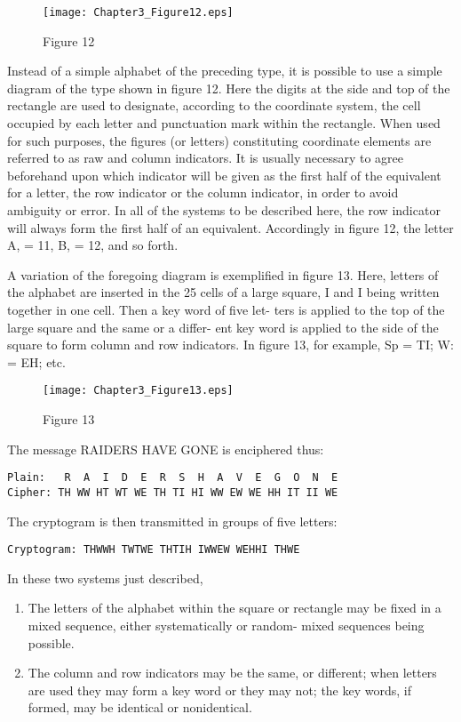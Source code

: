 \begin{figure}[h]
 \centering
 \texttt{[image: Chapter3\_Figure12.eps]}
 \caption{Figure 12}
\end{figure}

\mypara Instead of a simple alphabet of the preceding type, it is possible
to use a simple diagram of the type shown in ﬁgure 12. Here the digits
at the side and top of the rectangle are used to designate, according to
the coordinate system, the cell occupied by each letter and punctuation
mark within the rectangle. When used for such purposes, the ﬁgures (or
letters) constituting coordinate elements are referred to as raw and
column indicators. It is usually necessary to agree beforehand upon
which indicator will be given as the ﬁrst half of the equivalent for a
letter, the row indicator or the column indicator, in order to avoid
ambiguity or error. In all of the systems to be described here, the row
indicator will always form the ﬁrst half of an equivalent. Accordingly
in ﬁgure 12, the letter A, = 11, B, = 12, and so forth.

\mypara A variation of the foregoing diagram is exempliﬁed in ﬁgure 13.
Here, letters of the alphabet are inserted in the 25 cells of a large square,
I and I being written together in one cell. Then a key word of ﬁve let-
ters is applied to the top of the large square and the same or a differ-
ent key word is applied to the side of the square to form column and row
indicators. In ﬁgure 13, for example, Sp = TI; W: = EH; etc.

\begin{figure}[h]
 \centering
 \texttt{[image: Chapter3\_Figure13.eps]}
 \caption{Figure 13}
\end{figure}

The message RAIDERS HAVE GONE is enciphered thus:

\begin{verbatim}
Plain:   R  A  I  D  E  R  S  H  A  V  E  G  O  N  E
Cipher: TH WW HT WT WE TH TI HI WW EW WE HH IT II WE
\end{verbatim}

The cryptogram is then transmitted in groups of ﬁve letters:
\begin{verbatim}
Cryptogram: THWWH TWTWE THTIH IWWEW WEHHI THWE
\end{verbatim}

\mypara In these two systems just described,

\begin{enumerate}
\item The letters of the alphabet within the square or rectangle may
be ﬁxed in a mixed sequence, either systematically or random-
mixed sequences being possible.

\item The column and row indicators may be the same, or different;
when letters are used they may form a key word or they may
not; the key words, if formed, may be identical or nonidentical.
\end{enumerate}

